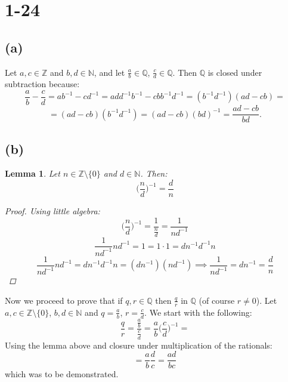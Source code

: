 \documentclass{article}
\newtheorem*{lemma*}{Lemma}
\begin{document}
\section*{1-24}
\subsection*{(a)}
Let \(a, c \in \mathbb{Z}\) and \(b, d \in \mathbb{N}\), and let \(\frac{a}{b} \in \mathbb{Q}\), \(\frac{c}{d} \in \mathbb{Q}\).
Then \(\mathbb{Q}\) is closed under subtraction because:
\begin{equation*}
    \frac{a}{b} - \frac{c}{d} = ab^{-1} - cd^{-1} = add^{-1}b^{-1} - cbb^{-1}d^{-1} = (b^{-1}d^{-1})(ad - cb) = 
\end{equation*}
\begin{equation*}
    = (ad - cb)(b^{-1}d^{-1}) = (ad - cb)(bd)^{-1} = \frac{ad - cb}{bd}.
\end{equation*}
\subsection*{(b)}
\begin{lemma*}
    Let \(n \in \mathbb{Z} \setminus \{0\}\) and \(d \in \mathbb{N}\). 
    Then:
    \begin{equation*}
        \Big(\frac{n}{d}\Big)^{-1} = \frac{d}{n}
    \end{equation*}
    \begin{proof}
    Using little algebra:
    \begin{equation*}
        \Big(\frac{n}{d}\Big)^{-1} = \frac{1}{\frac{n}{d}} = \frac{1}{nd^{-1}}
    \end{equation*}
    \begin{equation*}
        \frac{1}{nd^{-1}}nd^{-1} = 1 = 1 \cdot 1 = dn^{-1}d^{-1}n
    \end{equation*}
    \begin{equation*}
        \frac{1}{nd^{-1}}nd^{-1} = dn^{-1}d^{-1}n = (dn^{-1})(nd^{-1}) \implies \frac{1}{nd^{-1}} = dn^{-1} = \frac{d}{n}
    \end{equation*}
    \end{proof}
\end{lemma*}
Now we proceed to prove that if \(q, r \in \mathbb{Q}\) then \(\frac{q}{r}\) in \(\mathbb{Q}\) (of course \(r \neq 0\)).
Let \(a, c \in \mathbb{Z} \setminus \{0\}\), \(b, d \in \mathbb{N}\) and \(q = \frac{a}{b}\), \(r = \frac{c}{d}\).
We start with the following:
\begin{equation*}
    \frac{q}{r} = \frac{\frac{a}{b}}{\frac{c}{d}} = \frac{a}{b}\Big(\frac{c}{d}\Big)^{-1} = 
\end{equation*}
Using the lemma above and closure under multiplication of the rationals:
\begin{equation*}
    = \frac{a}{b}\frac{d}{c} = \frac{ad}{bc}
\end{equation*}
which was to be demonstrated.
\end{document}
